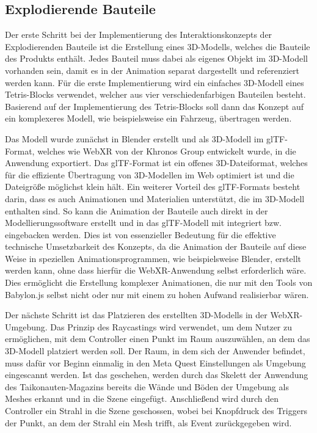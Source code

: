 \subsection{Explodierende Bauteile}

Der erste Schritt bei der Implementierung des Interaktionskonzepts der Explodierenden Bauteile ist die Erstellung eines 3D-Modells, welches die Bauteile des Produkts enthält.
Jedes Bauteil muss dabei als eigenes Objekt im 3D-Modell vorhanden sein, damit es in der Animation separat dargestellt und referenziert werden kann.
Für die erste Implementierung wird ein einfaches 3D-Modell eines Tetris-Blocks verwendet, welcher aus vier verschiedenfarbigen Bauteilen besteht.
Basierend auf der Implementierung des Tetris-Blocks soll dann das Konzept auf ein komplexeres Modell, wie beispielsweise ein Fahrzeug, übertragen werden.

Das Modell wurde zunächst in Blender erstellt und als 3D-Modell im glTF-Format, welches wie WebXR von der Khronos Group entwickelt wurde, in die Anwendung exportiert.
Das glTF-Format ist ein offenes 3D-Dateiformat, welches für die effiziente Übertragung von 3D-Modellen im Web optimiert ist und die Dateigröße möglichst klein hält.
Ein weiterer Vorteil des glTF-Formats besteht darin, dass es auch Animationen und Materialien unterstützt, die im 3D-Modell enthalten sind.
So kann die Animation der Bauteile auch direkt in der Modellierungssoftware erstellt und in das glTF-Modell mit integriert bzw. eingebacken werden.
Dies ist von essenzieller Bedeutung für die effektive technische Umsetzbarkeit des Konzepts, da die Animation der Bauteile auf diese Weise in speziellen Animationsprogrammen, wie beispielsweise Blender, erstellt werden kann, ohne dass hierfür die WebXR-Anwendung selbst erforderlich wäre.
Dies ermöglicht die Erstellung komplexer Animationen, die nur mit den Tools von Babylon.js selbst nicht oder nur mit einem zu hohen Aufwand realisierbar wären.

Der nächste Schritt ist das Platzieren des erstellten 3D-Modells in der WebXR-Umgebung.
Das Prinzip des Raycastings wird verwendet, um dem Nutzer zu ermöglichen, mit dem Controller einen Punkt im Raum auszuwählen, an dem das 3D-Modell platziert werden soll.
Der Raum, in dem sich der Anwender befindet, muss dafür vor Beginn einmalig in den Meta Quest Einstellungen als Umgebung eingescannt werden.
Ist das geschehen, werden durch das Skelett der Anwendung des Taikonauten-Magazins bereits die Wände und Böden der Umgebung als Meshes erkannt und in die Szene eingefügt.
Anschließend wird durch den Controller ein Strahl in die Szene geschossen, wobei bei Knopfdruck des Triggers der Punkt, an dem der Strahl ein Mesh trifft, als Event zurückgegeben wird.

